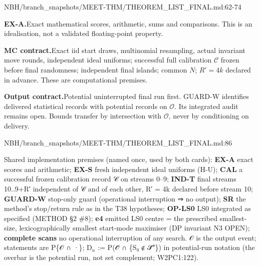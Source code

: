 \begin{stmt}{NBH/branch_snapshots/MEET-THM/THEOREM_LIST_FINAL.md:62-74}
\par\smallskip\noindent\textbf{EX-A.}\enspace Exact mathematical scores, arithmetic, sums and comparisons. This is an idealisation, not a validated floating-point property.
\par\smallskip\noindent\textbf{MC contract.}\enspace Exact iid start draws, multinomial resampling, actual invariant move rounds, independent ideal uniforms; successful full calibration \(\mathcal C\) frozen before final randomness; independent final islands; common \(N\); \(R'=4k\) declared in advance. These are computational premises.
\par\smallskip\noindent\textbf{Output contract.}\enspace Potential uninterrupted final run first. GUARD-W identifies delivered statistical records with potential records on \(\mathcal O\). Its integrated audit remains open. Bounds transfer by intersection with \(\mathcal O\), never by conditioning on delivery.
\end{stmt}

\begin{stmt}{NBH/branch_snapshots/MEET-THM/THEOREM_LIST_FINAL.md:86}
\par\noindent Shared implementation premises (named once, used by both cards): \textbf{EX-A} exact scores and arithmetic; \textbf{EX-S} fresh independent ideal uniforms (H-U); \textbf{CAL} a successful frozen calibration record 𝒞 on streams 0–9; \textbf{IND-T} final streams 10..9+R′ independent of 𝒞 and of each other, R′ = 4k declared before stream 10; \textbf{GUARD-W} stop-only guard (operational interruption ⇒ no output); \textbf{SR} the method's stop/return rule as in the T38 hypotheses; \textbf{OP-LS0} LS0 integrated as specified (METHOD §2 \#8); \textbf{e4} emitted LS0 centre = the prescribed smallest-size, lexicographically smallest start-mode maximiser (DP invariant N3 OPEN); \textbf{complete scans} no operational interruption of any search. 𝒪 is the output event; statements are P\{𝒪 ∩ ·\}; D$_{n}$ := P(𝒪̄ ∩ \{S₀ ∉ 𝒮̄⁺\}) in potential-run notation (the overbar is the potential run, not set complement; W2PC1:122).
\end{stmt}

